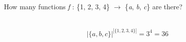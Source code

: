 How many functions \textit{f} : \{1, 2, 3, 4\} $\to$ \{\textit{a}, \textit{b}, \textit{c}\} are there?

\begin{solution}\ \\
\[|\{a, b, c\}|^{|\{1, 2, 3, 4\}|} = 3^4 = 36\]
\end{solution}